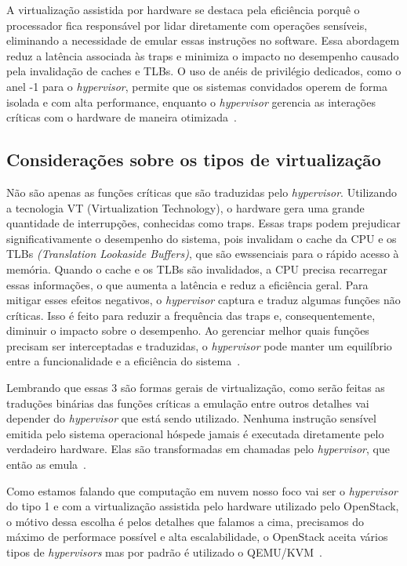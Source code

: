 A virtualização assistida por hardware se destaca pela eficiência porquê o processador fica responsável por lidar diretamente com operações sensíveis, eliminando a necessidade de emular essas instruções no software. Essa abordagem reduz a latência associada às traps e minimiza o impacto no desempenho causado pela invalidação de caches e TLBs. O uso de anéis de privilégio dedicados, como o anel -1 para o \textit{hypervisor}, permite que os sistemas convidados operem de forma isolada e com alta performance, enquanto o \textit{hypervisor} gerencia as interações críticas com o hardware de maneira otimizada~\citep{chirammal2016mastering}.

\subsection{Considerações sobre os tipos de virtualização}

Não são apenas as funções críticas que são traduzidas pelo \textit{hypervisor}. Utilizando a tecnologia VT (Virtualization Technology), o hardware gera uma grande quantidade de interrupções, conhecidas como traps. Essas traps podem prejudicar significativamente o desempenho do sistema, pois invalidam o cache da CPU e os TLBs \textit{(Translation Lookaside Buffers)}, que são ewssenciais para o rápido acesso à memória. Quando o cache e os TLBs são invalidados, a CPU precisa recarregar essas informações, o que aumenta a latência e reduz a eficiência geral. Para mitigar esses efeitos negativos, o \textit{hypervisor} captura e traduz algumas funções não críticas. Isso é feito para reduzir a frequência das traps e, consequentemente, diminuir o impacto sobre o desempenho. Ao gerenciar melhor quais funções precisam ser interceptadas e traduzidas, o \textit{hypervisor} pode manter um equilíbrio entre a funcionalidade e a eficiência do sistema~\citep{modernOS}.

Lembrando que essas 3 são formas gerais de virtualização, como serão feitas as traduções binárias das funções críticas a emulação entre outros detalhes vai depender do \textit{hypervisor} que está sendo utilizado. Nenhuma instrução sensível emitida pelo sistema operacional hóspede jamais é executada diretamente pelo verdadeiro hardware. Elas são transformadas em chamadas pelo \textit{hypervisor}, que então as emula~\citep{modernOS}.

Como estamos falando que computação em nuvem nosso foco vai ser o \textit{hypervisor} do tipo 1 e com a virtualização assistida pelo hardware utilizado pelo OpenStack, o mótivo dessa escolha é pelos detalhes que falamos a cima, precisamos do máximo de performace possível e alta escalabilidade, o OpenStack aceita vários tipos de \textit{hypervisors} mas por padrão é utilizado o QEMU/KVM~\citep{DocumentacaoOpenstack}.


